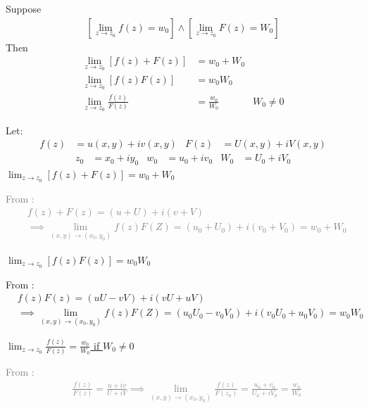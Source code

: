 \documentclass[12pt, english]{book}
\makeatletter
\renewenvironment{proof}[1][\proofname]{\par
	\pushQED{\qed}%
	\normalfont \topsep6\p@\@plus6\p@\relax
	\list{}{%
		\settowidth{\leftmargin}{\itshape\proofname:\hskip\labelsep}%
		\setlength{\labelwidth}{0pt}%
		\setlength{\itemindent}{-\leftmargin}%
	}%
	\item[\hskip\labelsep\itshape#1\@addpunct{:}]\ignorespaces
	}{ \popQED\endlist\@endpefalse}
\makeatother
\begin{document}
	\begin{theorem}
		Suppose
		\begin{align*}
		\left[\lim_{z\rightarrow z_0} f(z) = w_0 \right] \land \left[\lim_{z\rightarrow z_0} F(z) = W_0 \right]
		\end{align*}
		Then
		\begin{align*}
			\lim_{z \rightarrow z_0} [f(z) + F(z)] &= w_0 + W_0 & \\
			\lim_{z \rightarrow z_0} [f(z)F(z)] &= w_0 W_0  & \\
			\lim_{z \rightarrow z_0} \frac{f(z)}{F(z)} &= \frac{w_0}{W_0} & W_0 \neq 0
		\end{align*}
		\label{Limit of f(z)+F(z) f(z)F(z) and f(z)/F(z) Theorem - Complex}
	\end{theorem}
	\begin{proof}
		Let: 
		\begin{align*}
			f(z) &= u(x,y) + iv(x,y) & F(z) &= U(x,y) + iV(x,y) 
		\end{align*}
		\begin{align*}
			z_0 &= x_0 + iy_0 	& w_0 &= u_0 + iv_0 & W_0 &= U_0 + iV_0
		\end{align*}
		\underline{$\lim_{z \rightarrow z_0} [f(z) + F(z)] = w_0 + W_0$}
		
		\textcolor{Grey}{
		From :
		\begin{align*}
			&f(z) + F(z) = (u + U) + i(v + V) \\
			&\implies \lim_{(x,y) \rightarrow (x_0, y_0)} f(z)F(Z) = (u_0 + U_0) + i(v_0 + V_0) = w_0 + W_0
		\end{align*}
		}
		
		\underline{$\lim_{z \rightarrow z_0} [f(z)F(z)] = w_0 W_0$}
		
		From :
		\begin{align*}
			&f(z)F(z) = (uU - vV) + i(vU + uV) \\
			&\implies \lim_{(x,y) \rightarrow (x_0, y_0)} f(z)F(Z) = (u_0 U_0 - v_0 V_0) + i(v_0 U_0 + u_0 V_0) = w_0 W_0
		\end{align*}
		
		\underline{$\lim_{z \rightarrow z_0} \frac{f(z)}{F(z)} = \frac{w_0}{W_0}$ if $W_0 \neq 0$}
		
		\textcolor{Grey}{
		From :
		\begin{align*}
			&\frac{f(z)}{F(z)} = \frac{u+iv}{U+iV} 
			\implies \lim_{(x, y) \rightarrow (x_0, y_0)} \frac{f(z)}{F(z_0)} = \frac{u_0 + v_0}{U_0 + iV_0} = \frac{w_0}{W_0}
		\end{align*}
		}
	\end{proof}
\end{document}
